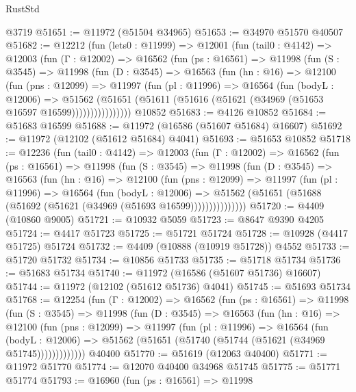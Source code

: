 \begin{lexlean}{RustStd}
\begin{coremodule}
    @3719
@51651 := @11972 (@51504 @34965)
@51653 := @34970 @51570 @40507
@51682 := @12212
    (fun (lets0 : @11999) =>
    @12001
      (fun (tail0 : @4142) =>
      @12003
        (fun (Γ : @12002) =>
        @16562
          (fun (ps : @16561) =>
          @11998
            (fun (S : @3545) =>
            @11998
              (fun (D : @3545) =>
              @16563
                (fun (hn : @16) =>
                @12100
                  (fun (pns : @12099) =>
                  @11997
                    (fun (pl : @11996) =>
                    @16564
                      (fun (bodyL : @12006) =>
                      @51562
                        (@51651
                          (@51611 (@51616 (@51621 (@34969 (@51653 @16597 @16599))))))))))))))))
    @10852
@51683 := @4126 @10852
@51684 := @51683 @16599
@51688 := @11972 (@16586 (@51607 @51684) @16607)
@51692 := @11972 (@12102 (@51612 @51684) @4041)
@51693 := @51653 @10852
@51718 := @12236
    (fun (tail0 : @4142) =>
    @12003
      (fun (Γ : @12002) =>
      @16562
        (fun (ps : @16561) =>
        @11998
          (fun (S : @3545) =>
          @11998
            (fun (D : @3545) =>
            @16563
              (fun (hn : @16) =>
              @12100
                (fun (pns : @12099) =>
                @11997
                  (fun (pl : @11996) =>
                  @16564
                    (fun (bodyL : @12006) =>
                    @51562 (@51651 (@51688 (@51692 (@51621 (@34969 (@51693 @16599)))))))))))))))
@51720 := @4409 (@10860 @9005)
@51721 := @10932 @5059
@51723 := @8647 @9390 @4205
@51724 := @4417 @51723
@51725 := @51721 @51724
@51728 := @10928 (@4417 @51725) @51724
@51732 := @4409 (@10888 (@10919 @51728)) @4552
@51733 := @51720 @51732
@51734 := @10856 @51733
@51735 := @51718 @51734
@51736 := @51683 @51734
@51740 := @11972 (@16586 (@51607 @51736) @16607)
@51744 := @11972 (@12102 (@51612 @51736) @4041)
@51745 := @51693 @51734
@51768 := @12254
    (fun (Γ : @12002) =>
    @16562
      (fun (ps : @16561) =>
      @11998
        (fun (S : @3545) =>
        @11998
          (fun (D : @3545) =>
          @16563
            (fun (hn : @16) =>
            @12100
              (fun (pns : @12099) =>
              @11997
                (fun (pl : @11996) =>
                @16564
                  (fun (bodyL : @12006) =>
                  @51562 (@51651 (@51740 (@51744 (@51621 (@34969 @51745)))))))))))))
    @40400
@51770 := @51619 (@12063 @40400)
@51771 := @11972 @51770
@51774 := @12070 @40400 @34968 @51745
@51775 := @51771 @51774
@51793 := @16960
    (fun (ps : @16561) =>
    @11998

\end{coremodule}
\end{lexlean}
